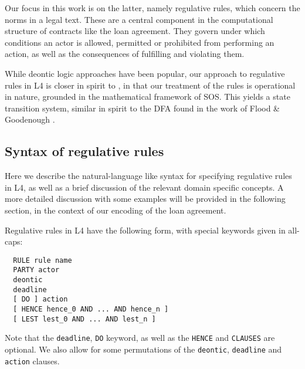 \documentclass{article}
\begin{document}
Our focus in this work is on the latter, namely regulative rules, which concern
the norms in a legal text.
These are a central component in the computational structure of contracts like
the loan agreement.
They govern under which conditions an actor is allowed,
permitted or prohibited from performing an action, as well as the consequences
of fulfilling and violating them.


While deontic logic approaches have been popular,
our approach to regulative rules in L4 is closer in spirit to
\cite{real_time_contract_automata, normative_diags_diogo},
in that our treatment of the rules is operational in nature, grounded in the
mathematical framework of SOS.
This yields a state transition system, similar in spirit to the DFA found in
the work of Flood \& Goodenough \cite{contract_as_automaton}.

\subsection{Syntax of regulative rules}
Here we describe the natural-language like syntax for specifying regulative
rules in L4, as well as a brief discussion of the relevant domain specific
concepts.
A more detailed discussion with some examples will be provided in the following
section, in the context of our encoding of the loan agreement.

Regulative rules in L4 have the following form, with special keywords given
in all-caps:
\begin{lstlisting}
  RULE rule name
  PARTY actor
  deontic
  deadline
  [ DO ] action
  [ HENCE hence_0 AND ... AND hence_n ]
  [ LEST lest_0 AND ... AND lest_n ]
\end{lstlisting}

Note that the \texttt{deadline}, \texttt{DO} keyword, as well as the
\texttt{HENCE} and \texttt{CLAUSES} are optional.
We also allow for some permutations of the \texttt{deontic}, \texttt{deadline}
and \texttt{action} clauses.
\end{document}
